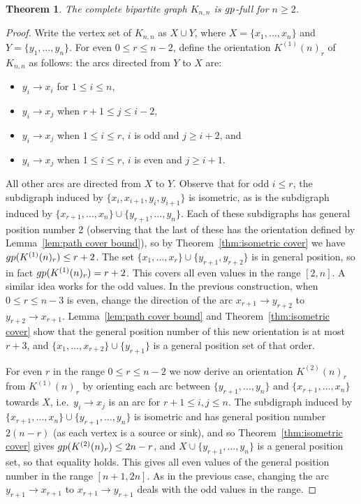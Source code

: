 \documentclass[10pt,a4paper]{amsart}
\newtheorem{theorem}{Theorem}
\newcommand{\gp}{{\rm gp}}
\begin{document}
	\begin{theorem}
		The complete bipartite graph $K_{n,n}$ is $\gp $-full for $n \geq 2$.
	\end{theorem}

	\begin{proof}
		Write the vertex set of $K_{n,n}$ as $X \cup Y$, where $X = \{ x_1,\ldots ,x_n\} $ and $Y= \{ y_1,\ldots ,y_n\} $. For even $0 \leq r \leq n-2$, define the orientation $K^{(1)}(n)_r$ of $K_{n,n}$ as follows: the arcs directed from $Y$ to $X$ are:
		\begin{itemize}
			\item $y_i \rightarrow x_i$ for $1 \leq i \leq n$,
			\item $y_i \rightarrow x_j$ when $r+1 \leq j \leq i-2$, 
			\item $y_i \rightarrow x_j$ when $1 \leq i \leq r$, $i$ is odd and $j \geq i+2$, and
			\item $y_i \rightarrow x_j$ when $1 \leq i \leq r$, $i$ is even and $j \geq i+1$.
		\end{itemize}
		All other arcs are directed from $X$ to $Y$. Observe that for odd $i \leq r$, the subdigraph induced by $\{ x_i,x_{i+1},y_i,y_{i+1}\} $ is isometric, as is the subdigraph induced by $\{ x_{r+1},\ldots ,x_n\} \cup \{ y_{r+1},\ldots ,y_n\} $. Each of these subdigraphs has general position number 2 (observing that the last of these has the orientation defined by Lemma~\ref{lem:path cover bound}), so by Theorem~\ref{thm:isometric cover} we have $\gp (K^{(1)}(n)_r) \leq r+2$. The set $\{ x_1,\ldots ,x_r\} \cup \{ y_{r+1},y_{r+2}\} $ is in general position, so in fact $\gp (K^{(1)}(n)_r) = r+2$. This covers all even values in the range $[2,n]$. A similar idea works for the odd values. In the previous construction, when $0 \leq r \leq n-3$ is even, change the direction of the arc $x_{r+1} \rightarrow y_{r+2}$ to $y_{r+2} \rightarrow x_{r+1}$. Lemma~\ref{lem:path cover bound} and Theorem~\ref{thm:isometric cover} show that the general position number of this new orientation is at most $r+3$, and $\{ x_1,\ldots ,x_{r+2}\} \cup \{ y_{r+1}\} $ is a general position set of that order.
		
		For even $r$ in the range $0 \leq r \leq n-2$ we now derive an orientation $K^{(2)}(n)_r$ from $K^{(1)}(n)_r$ by orienting each arc between $\{ y_{r+1},\ldots ,y_n\} $ and $\{ x_{r+1},\ldots ,x_n\} $ towards $X$, i.e.\ $y_i \rightarrow x_j$ is an arc for $r+1 \leq i,j \leq n$. The subdigraph induced by $\{ x_{r+1},\ldots ,x_n\} \cup \{ y_{r+1},\ldots ,y_n\} $ is isometric and has general position number $2(n-r)$ (as each vertex is a source or sink), and so Theorem~\ref{thm:isometric cover} gives $\gp (K^{(2)}(n)_r) \leq 2n-r$, and $X \cup \{ y_{r+1},\ldots ,y_n\} $ is a general position set, so that equality holds. This gives all even values of the general position number in the range $[n+1,2n]$. As in the previous case, changing the arc $y_{r+1} \rightarrow x_{r+1}$ to $x_{r+1} \rightarrow y_{r+1}$ deals with the odd values in the range.   
	\end{proof}
\end{document}

